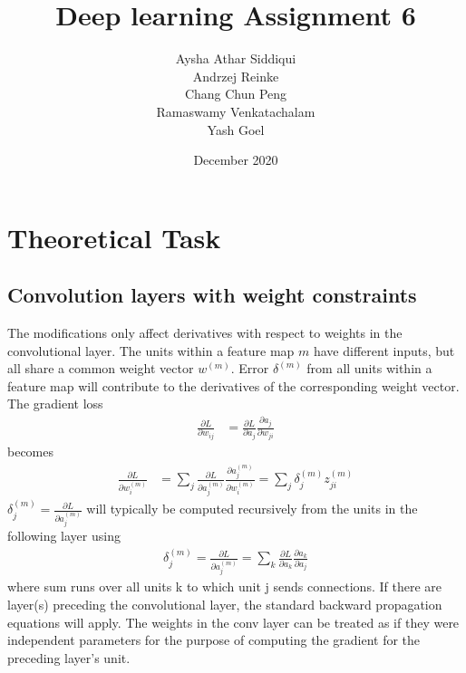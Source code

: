 \documentclass{article}
\title{Deep learning Assignment 6}
\author{Aysha Athar Siddiqui\\
Andrzej Reinke\\
Chang Chun Peng\\
Ramaswamy Venkatachalam\\
Yash Goel
}
\date{December 2020}
\begin{document}
\maketitle
\section{Theoretical Task}
\subsection{Convolution layers with weight constraints}
The modifications only affect derivatives with respect to weights in the convolutional layer. The units within a feature map $m$ have different inputs, but all share a common weight vector $w^{(m)}$. Error $\delta^{(m)}$ from all units within a feature map will contribute to the derivatives of the corresponding weight vector.
The gradient loss 
\begin{align*}
\frac{\partial L}{\partial w_{ij}}&=\frac{\partial L}{\partial a_{j}}\frac{\partial a_{j}}{\partial w_{ji}} 
\end{align*}
becomes
\begin{align*}
\frac{\partial L}{\partial w_{i}^{(m)}}&= \sum_{j}^{}\frac{\partial L}{\partial a_{j}^{(m)}}\frac{\partial a_{j}^{(m)}}{\partial w_{i}^{(m)}} = \sum_{j}^{} \delta_j^{(m)}z_{ji}^{(m)}
\end{align*}
$\delta_j^{(m)} = \frac{\partial L}{\partial a_{j}^{(m)}}$ will typically be computed recursively from  the units in the following layer using
\begin{align*}
\delta_j^{(m)} = \frac{\partial L}{\partial a_{j}^{(m)}} =\sum_{k}^{}\frac{\partial L}{\partial a_{k}}\frac{\partial a_{k}}{\partial a_{j}}
\end{align*}
where sum runs over all units k to which unit j sends connections.
If there are layer(s) preceding the convolutional layer, the standard backward propagation equations will apply. The weights in the conv layer can be treated as if they were independent parameters for the purpose of computing the gradient for the preceding layer's unit.
\end{document}
